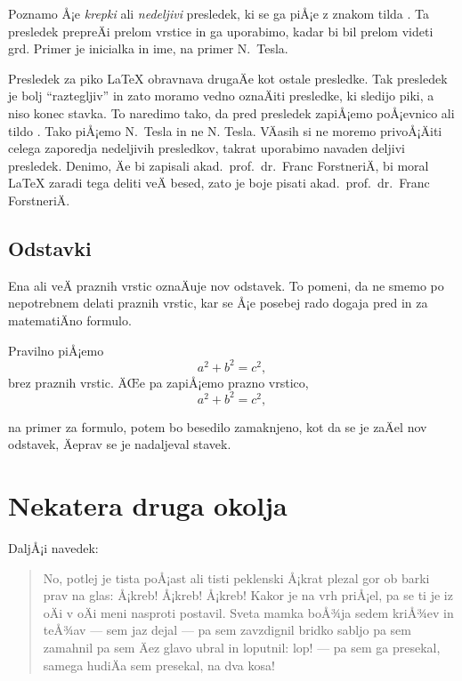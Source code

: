 \documentclass[a4paper]{article}
\begin{document}
Poznamo Å¡e \emph{krepki} ali \emph{nedeljivi} presledek, ki se ga piÅ¡e z znakom tilda
\texttt{}. Ta presledek prepreÄi prelom vrstice in ga uporabimo, kadar bi bil
prelom videti grd. Primer je inicialka in ime, na primer N.~Tesla.

Presledek za piko {\LaTeX} obravnava drugaÄe kot ostale presledke. Tak presledek je bolj
``raztegljiv'' in zato moramo vedno oznaÄiti presledke, ki sledijo piki, a niso konec
stavka. To naredimo tako, da pred presledek zapiÅ¡emo poÅ¡evnico \texttt{} ali tildo
\texttt{}. Tako piÅ¡emo N.~Tesla in ne N. Tesla. VÄasih si ne moremo privoÅ¡Äiti
celega zaporedja nedeljivih presledkov, takrat uporabimo navaden deljivi presledek.
Denimo, Äe bi zapisali akad.~prof.~dr.~Franc ForstneriÄ, bi moral {\LaTeX} zaradi tega
deliti veÄ besed, zato je boje pisati akad.\ prof.\ dr.~Franc ForstneriÄ.






\subsection{Odstavki}

Ena ali veÄ praznih vrstic oznaÄuje nov odstavek. To pomeni, da ne smemo po nepotrebnem
delati praznih vrstic, kar se Å¡e posebej rado dogaja pred in za matematiÄno formulo.

Pravilno piÅ¡emo
\[
   a^2 + b^2 = c^2,
\]
brez praznih vrstic. ÄŒe pa zapiÅ¡emo prazno vrstico,
\[
   a^2 + b^2 = c^2,
\]

na primer za formulo, potem bo besedilo zamaknjeno, kot da se je zaÄel nov odstavek,
Äeprav se je nadaljeval stavek.



\section{Nekatera druga okolja}

DaljÅ¡i navedek:
%
\begin{quote}
  No, potlej je tista poÅ¡ast ali tisti peklenski Å¡krat plezal gor ob barki prav na glas:
  Å¡kreb! Å¡kreb! Å¡kreb! Kakor je na vrh priÅ¡el, pa se ti je iz oÄi v oÄi meni nasproti
  postavil. Sveta mamka boÅ¾ja sedem kriÅ¾ev in teÅ¾av --- sem jaz dejal --- pa sem zavzdignil
  bridko sabljo pa sem zamahnil pa sem Äez glavo ubral in loputnil: lop! --- pa sem ga
  presekal, samega hudiÄa sem presekal, na dva kosa!
\end{quote}
\end{document}
